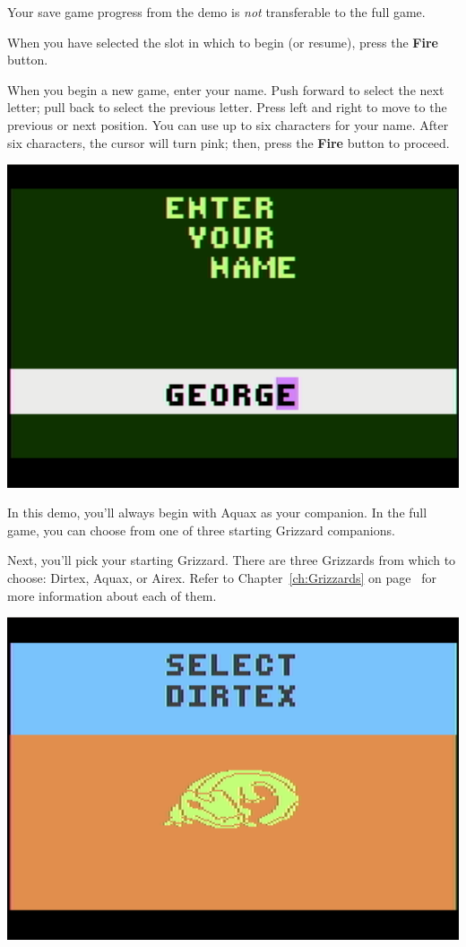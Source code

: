 \documentclass[9pt,twocolumn,openany,article]{memoir}
\begin{document}
Your save game progress from the demo is \emph{not} transferable to the
full game.

\skip

\fi

When you have selected the slot in which to begin (or resume), press the
\textbf{Fire} button.

\fi

\ifdefined\NOSAVE\else

When you begin a  new game, enter your name. Push  forward to select the
next letter;  pull back to  select the  previous letter. Press  left and
right to move to  the previous or next position. You can  use up to six
characters for  your name.  After six characters,  the cursor  will turn
pink; then, press the \textbf{Fire} button to proceed.

\begin{center}
  \includegraphics[width=.75\columnwidth]{../Manual/NameEntryNTSC.png}
\end{center}

\ifdefined\DEMO

In this demo,  you'll always begin with Aquax as  your companion. In the
full game, you can choose from one of three starting Grizzard companions.

\else

Next, you'll pick your starting Grizzard. There are three Grizzards from
which    to    choose:   Dirtex,    Aquax,    or    Airex.   Refer    to
Chapter~\ref{ch:Grizzards}   on  page~\pageref{ch:Grizzards}   for  more
information about each of them.

\begin{center}
  \includegraphics[width=.75\columnwidth]{../Manual/GrizzardChooserNTSC.png}
\end{center}
\end{document}
